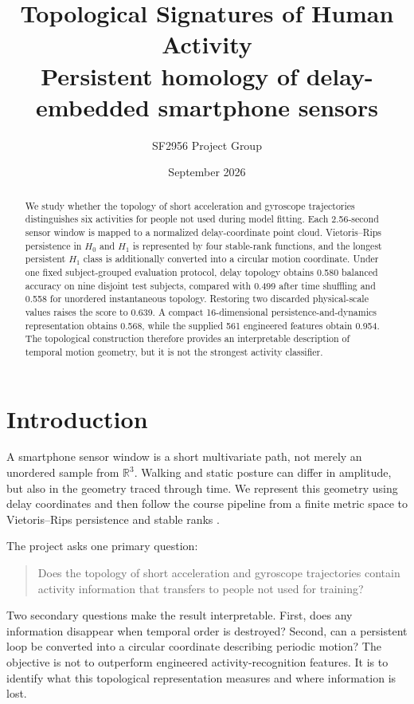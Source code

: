 \documentclass[11pt,a4paper]{article}
\title{\textbf{Topological Signatures of Human Activity}\\
\large Persistent homology of delay-embedded smartphone sensors}
\author{SF2956 Project Group}
\date{September 2026}
\begin{document}
\maketitle

\begin{abstract}
We study whether the topology of short acceleration and gyroscope trajectories distinguishes six activities for people not used during model fitting. Each 2.56-second sensor window is mapped to a normalized delay-coordinate point cloud. Vietoris--Rips persistence in $H_0$ and $H_1$ is represented by four stable-rank functions, and the longest persistent $H_1$ class is additionally converted into a circular motion coordinate. Under one fixed subject-grouped evaluation protocol, delay topology obtains 0.580 balanced accuracy on nine disjoint test subjects, compared with 0.499 after time shuffling and 0.558 for unordered instantaneous topology. Restoring two discarded physical-scale values raises the score to 0.639. A compact 16-dimensional persistence-and-dynamics representation obtains 0.568, while the supplied 561 engineered features obtain 0.954. The topological construction therefore provides an interpretable description of temporal motion geometry, but it is not the strongest activity classifier.
\end{abstract}

\section{Introduction}

A smartphone sensor window is a short multivariate path, not merely an unordered sample from $\mathbb R^3$. Walking and static posture can differ in amplitude, but also in the geometry traced through time. We represent this geometry using delay coordinates and then follow the course pipeline from a finite metric space to Vietoris--Rips persistence and stable ranks \cite{course-notes}.

The project asks one primary question:

\begin{quote}
Does the topology of short acceleration and gyroscope trajectories contain activity information that transfers to people not used for training?
\end{quote}

Two secondary questions make the result interpretable. First, does any information disappear when temporal order is destroyed? Second, can a persistent loop be converted into a circular coordinate describing periodic motion? The objective is not to outperform engineered activity-recognition features. It is to identify what this topological representation measures and where information is lost.
\end{document}
